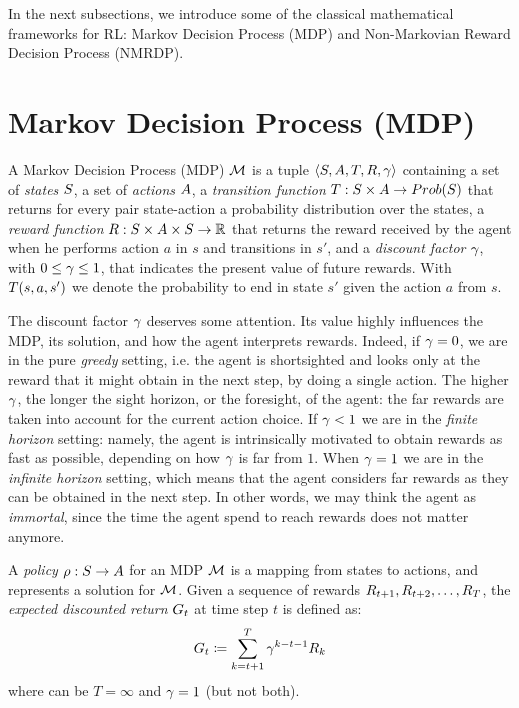 In the next subsections, we introduce some of the classical mathematical frameworks for RL: Markov Decision Process (MDP) and Non-Markovian Reward Decision Process (NMRDP).
\section{Markov Decision Process (MDP)}
\label{MDP}

A Markov Decision Process (MDP) $\mathcal{M}$ is a tuple $\langle S, A, T, R, \gamma \rangle$ containing a set of \emph{states} $S$, a set of \emph{actions} $A$, a \emph{transition function} $T: S \times A \to Prob(S)$ that returns for every pair state-action a probability distribution over the states, a \emph{reward function} $R: S \times A \times S \to \mathbb{R}$ that returns the reward received by the agent when he performs action $a$ in $s$ and transitions in $s'$, and a \emph{discount factor} $\gamma$, with $0 \le \gamma \le 1$, that indicates the present value of future rewards. With $T(s, a, s')$ we denote the probability to end in state $s'$ given the action $a$ from $s$.

The discount factor $\gamma$ deserves some attention. Its value highly influences the MDP, its solution, and how the agent interprets rewards. Indeed, if $\gamma = 0$, we are in the pure \emph{greedy} setting, i.e. the agent is shortsighted and looks only at the reward that it might obtain in the next step, by doing a single action. The higher $\gamma$, the longer the sight horizon, or the foresight, of the agent: the far rewards are taken into account for the current action choice. If $\gamma < 1$ we are in the \emph{finite horizon} setting: namely, the agent is intrinsically motivated to obtain rewards as fast as possible, depending on how $\gamma$ is far from $1$. When $\gamma = 1$ we are in the \emph{infinite horizon} setting, which means that the agent considers far rewards as they can be obtained in the next step. In other words, we may think the agent as \emph{immortal}, since the time the agent spend to reach rewards does not matter anymore.

\medskip
A \emph{policy} $\rho: S \to A$ for an MDP $\mathcal{M}$ is a mapping from states to actions, and represents a solution for $\mathcal{M}$. Given a sequence of rewards $R_{t+1}, R_{t+2}, \dots, R_{T}$, the \emph{expected discounted return} $G_t$ at time step $t$
is defined as: 
\begin{equation}\label{def:expected-discounted-return}
G_t \coloneqq \sum_{k=t+1}^T \gamma^{k-t-1}R_k
\end{equation} where can be $T = \infty$ and $\gamma = 1$ (but not both). 

